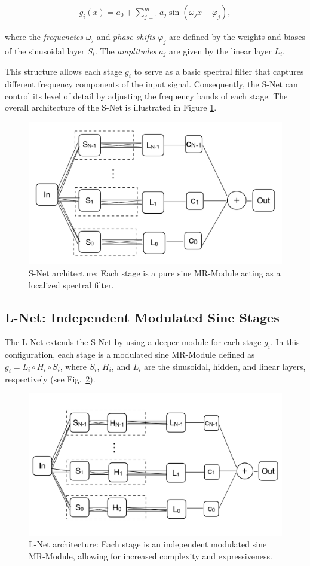 \begin{align}
    g_i(x) = a_0 + \sum_{j=1}^m a_j \sin\left(\omega_j x + \varphi_j\right),
\end{align}


where the \textit{frequencies} \( \omega_j \) and \textit{phase shifts} \( \varphi_j \) are defined by the weights and biases of the sinusoidal layer \( S_i \). The \textit{amplitudes} \( a_j \) are given by the linear layer \( L_i \).

This structure allows each stage \( g_i \) to serve as a basic spectral filter that captures different frequency components of the input signal. Consequently, the S-Net can control its level of detail by adjusting the frequency bands of each stage. The overall architecture of the S-Net is illustrated in Figure \ref{f:s-net}.

\begin{figure}[!h]
\centering
\includegraphics[width=0.58\linewidth]{img/ch4/snet.pdf}
\caption{S-Net architecture: Each stage is a pure sine MR-Module acting as a localized spectral filter.}
\label{f:s-net}
\end{figure}

\subsection{L-Net: Independent Modulated Sine Stages}
\label{s-lnet}

The L-Net extends the S-Net by using a deeper module for each stage \( g_i \). In this configuration, each stage is a modulated sine MR-Module defined as \( g_i = L_i \circ H_i \circ S_i \), where \( S_i \), \( H_i \), and \( L_i \) are the sinusoidal, hidden, and linear layers, respectively (see Fig.~\ref{f:l-net}).

\begin{figure}[!h]
    \centering
    \includegraphics[width=0.7\linewidth]{img/ch4/lnet.pdf}
    \caption{L-Net architecture: Each stage is an independent modulated sine MR-Module, allowing for increased complexity and expressiveness.}
    \label{f:l-net}
\end{figure}

